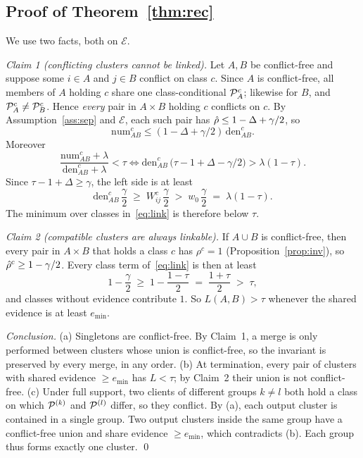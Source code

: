\subsection{Proof of Theorem~\ref{thm:rec}}
We use two facts, both on $\mathcal E$.

\emph{Claim 1 (conflicting clusters cannot be linked).} Let $A,B$ be conflict-free and suppose some $i\in A$ and $j\in B$ conflict on class $c$. Since $A$ is conflict-free, all members of $A$ holding $c$ share one class-conditional $\mathcal{P}_A^c$; likewise for $B$, and $\mathcal{P}_A^c\neq\mathcal{P}_B^c$. Hence \emph{every} pair in $A\times B$ holding $c$ conflicts on $c$. By Assumption~\ref{ass:sep} and $\mathcal E$, each such pair has $\hat\rho\le1-\Delta+\gamma/2$, so
\[
\mathrm{num}^c_{AB}\le(1-\Delta+\gamma/2)\,\mathrm{den}^c_{AB}.
\]
Moreover
\[
\frac{\mathrm{num}^c_{AB}+\lambda}{\mathrm{den}^c_{AB}+\lambda}<\tau
\iff
\mathrm{den}^c_{AB}\,\big(\tau-1+\Delta-\gamma/2\big)>\lambda(1-\tau).
\]
Since $\tau-1+\Delta\ge\gamma$, the left side is at least
\[
\mathrm{den}^c_{AB}\,\frac{\gamma}{2}\;\ge\;W_{ij}^c\,\frac{\gamma}{2}\;>\;w_0\,\frac{\gamma}{2}\;=\;\lambda(1-\tau).
\]
The minimum over classes in~\eqref{eq:link} is therefore below $\tau$.

\emph{Claim 2 (compatible clusters are always linkable).} If $A\cup B$ is conflict-free, then every pair in $A\times B$ that holds a class $c$ has $\rho^c=1$ (Proposition~\ref{prop:inv}), so $\hat\rho^c\ge1-\gamma/2$. Every class term of~\eqref{eq:link} is then at least
\[
1-\frac{\gamma}{2}\;\ge\;1-\frac{1-\tau}{2}\;=\;\frac{1+\tau}{2}\;>\;\tau,
\]
and classes without evidence contribute $1$. So $L(A,B)>\tau$ whenever the shared evidence is at least $e_{\min}$.

\emph{Conclusion.} (a) Singletons are conflict-free. By Claim~1, a merge is only performed between clusters whose union is conflict-free, so the invariant is preserved by every merge, in any order. (b) At termination, every pair of clusters with shared evidence $\ge e_{\min}$ has $L<\tau$; by Claim~2 their union is not conflict-free. (c) Under full support, two clients of different groups $k\ne l$ both hold a class on which $\mathcal{P}^{(k)}$ and $\mathcal{P}^{(l)}$ differ, so they conflict. By (a), each output cluster is contained in a single group. Two output clusters inside the same group have a conflict-free union and share evidence $\ge e_{\min}$, which contradicts (b). Each group thus forms exactly one cluster. \qed

